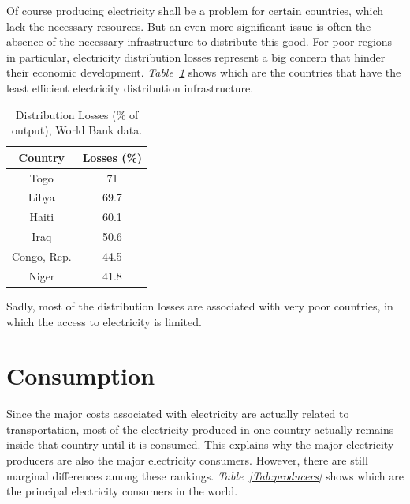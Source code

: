 \documentclass[a4paper,12pt]{book}
\begin{document}
Of course producing electricity shall be a problem for certain countries, which lack the necessary resources. But an even more significant issue is often the absence of the necessary infrastructure to distribute this good. For poor regions in particular, electricity distribution losses represent  a big concern that hinder their economic development. \textit{Table~\ref{fig:losses}} shows which are the countries that have the least efficient electricity distribution infrastructure.

\begin{table}[hbt]
\begin{center}
\begin{tabular}{|c|c|}
\hline
Country & Losses (\%)\\
\hline
Togo & 71\\
Libya & 69.7\\
Haiti & 60.1\\
Iraq & 50.6\\
Congo, Rep. & 44.5\\
Niger & 41.8\\
\hline
\end{tabular}
\caption{Distribution Losses (\% of output), World Bank data.}
\label{fig:losses}
\end{center}
\end{table}

Sadly, most of the distribution losses are associated with very poor countries, in which the access to electricity is limited.

\section{Consumption}

Since the major costs associated with electricity are actually related to transportation, most of the electricity produced in one country actually remains inside that country until it is consumed. This explains why the major electricity producers are also the major electricity consumers. However, there are still marginal differences among these rankings. \textit{Table~\ref{Tab:producers}} shows which are the principal electricity consumers in the world.
\end{document}
